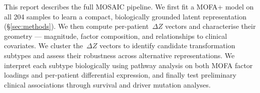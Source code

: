 This report describes the full MOSAIC pipeline.
We first fit a MOFA+ model on all 204 samples to learn a compact, biologically grounded
latent representation (\S\ref{sec:methods}).
We then compute per-patient~$\Delta Z$ vectors and characterise their geometry --- magnitude,
factor composition, and relationships to clinical covariates.
We cluster the~$\Delta Z$ vectors to identify candidate transformation subtypes and assess
their robustness across alternative representations.
We interpret each subtype biologically using pathway analysis on both MOFA factor loadings
and per-patient differential expression, and finally test preliminary clinical associations
through survival and driver mutation analyses.
